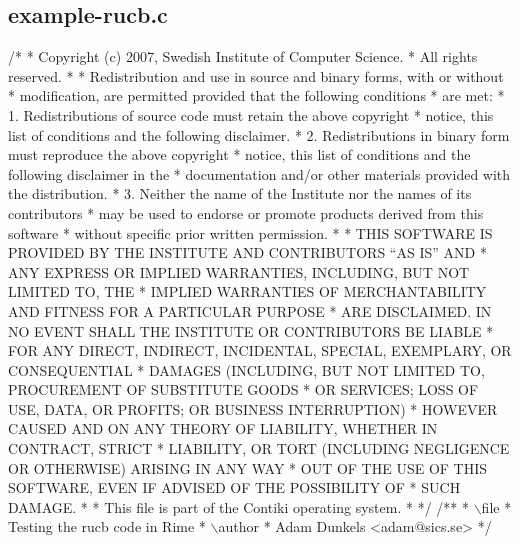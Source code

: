 \hypertarget{a00024}{}\subsection{example-\/rucb.\+c}

\begin{DoxyCodeInclude}
\textcolor{comment}{/*}
\textcolor{comment}{ * Copyright (c) 2007, Swedish Institute of Computer Science.}
\textcolor{comment}{ * All rights reserved.}
\textcolor{comment}{ *}
\textcolor{comment}{ * Redistribution and use in source and binary forms, with or without}
\textcolor{comment}{ * modification, are permitted provided that the following conditions}
\textcolor{comment}{ * are met:}
\textcolor{comment}{ * 1. Redistributions of source code must retain the above copyright}
\textcolor{comment}{ *    notice, this list of conditions and the following disclaimer.}
\textcolor{comment}{ * 2. Redistributions in binary form must reproduce the above copyright}
\textcolor{comment}{ *    notice, this list of conditions and the following disclaimer in the}
\textcolor{comment}{ *    documentation and/or other materials provided with the distribution.}
\textcolor{comment}{ * 3. Neither the name of the Institute nor the names of its contributors}
\textcolor{comment}{ *    may be used to endorse or promote products derived from this software}
\textcolor{comment}{ *    without specific prior written permission.}
\textcolor{comment}{ *}
\textcolor{comment}{ * THIS SOFTWARE IS PROVIDED BY THE INSTITUTE AND CONTRIBUTORS ``AS IS'' AND}
\textcolor{comment}{ * ANY EXPRESS OR IMPLIED WARRANTIES, INCLUDING, BUT NOT LIMITED TO, THE}
\textcolor{comment}{ * IMPLIED WARRANTIES OF MERCHANTABILITY AND FITNESS FOR A PARTICULAR PURPOSE}
\textcolor{comment}{ * ARE DISCLAIMED.  IN NO EVENT SHALL THE INSTITUTE OR CONTRIBUTORS BE LIABLE}
\textcolor{comment}{ * FOR ANY DIRECT, INDIRECT, INCIDENTAL, SPECIAL, EXEMPLARY, OR CONSEQUENTIAL}
\textcolor{comment}{ * DAMAGES (INCLUDING, BUT NOT LIMITED TO, PROCUREMENT OF SUBSTITUTE GOODS}
\textcolor{comment}{ * OR SERVICES; LOSS OF USE, DATA, OR PROFITS; OR BUSINESS INTERRUPTION)}
\textcolor{comment}{ * HOWEVER CAUSED AND ON ANY THEORY OF LIABILITY, WHETHER IN CONTRACT, STRICT}
\textcolor{comment}{ * LIABILITY, OR TORT (INCLUDING NEGLIGENCE OR OTHERWISE) ARISING IN ANY WAY}
\textcolor{comment}{ * OUT OF THE USE OF THIS SOFTWARE, EVEN IF ADVISED OF THE POSSIBILITY OF}
\textcolor{comment}{ * SUCH DAMAGE.}
\textcolor{comment}{ *}
\textcolor{comment}{ * This file is part of the Contiki operating system.}
\textcolor{comment}{ *}
\textcolor{comment}{ */}
\textcolor{comment}{}
\textcolor{comment}{/**}
\textcolor{comment}{ * \(\backslash\)file}
\textcolor{comment}{ *         Testing the rucb code in Rime}
\textcolor{comment}{ * \(\backslash\)author}
\textcolor{comment}{ *         Adam Dunkels <adam@sics.se>}
\textcolor{comment}{ */}


\end{DoxyCodeInclude}
